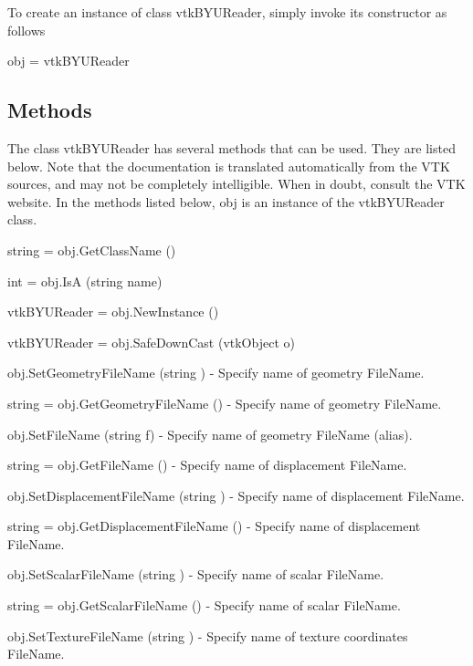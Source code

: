To create an instance of class vtk\-B\-Y\-U\-Reader, simply invoke its constructor as follows \begin{DoxyVerb}  obj = vtkBYUReader
\end{DoxyVerb}
 \hypertarget{vtkwidgets_vtkxyplotwidget_Methods}{}\subsection{Methods}\label{vtkwidgets_vtkxyplotwidget_Methods}
The class vtk\-B\-Y\-U\-Reader has several methods that can be used. They are listed below. Note that the documentation is translated automatically from the V\-T\-K sources, and may not be completely intelligible. When in doubt, consult the V\-T\-K website. In the methods listed below, {\ttfamily obj} is an instance of the vtk\-B\-Y\-U\-Reader class. 
\begin{DoxyItemize}
\item {\ttfamily string = obj.\-Get\-Class\-Name ()}  
\item {\ttfamily int = obj.\-Is\-A (string name)}  
\item {\ttfamily vtk\-B\-Y\-U\-Reader = obj.\-New\-Instance ()}  
\item {\ttfamily vtk\-B\-Y\-U\-Reader = obj.\-Safe\-Down\-Cast (vtk\-Object o)}  
\item {\ttfamily obj.\-Set\-Geometry\-File\-Name (string )} -\/ Specify name of geometry File\-Name.  
\item {\ttfamily string = obj.\-Get\-Geometry\-File\-Name ()} -\/ Specify name of geometry File\-Name.  
\item {\ttfamily obj.\-Set\-File\-Name (string f)} -\/ Specify name of geometry File\-Name (alias).  
\item {\ttfamily string = obj.\-Get\-File\-Name ()} -\/ Specify name of displacement File\-Name.  
\item {\ttfamily obj.\-Set\-Displacement\-File\-Name (string )} -\/ Specify name of displacement File\-Name.  
\item {\ttfamily string = obj.\-Get\-Displacement\-File\-Name ()} -\/ Specify name of displacement File\-Name.  
\item {\ttfamily obj.\-Set\-Scalar\-File\-Name (string )} -\/ Specify name of scalar File\-Name.  
\item {\ttfamily string = obj.\-Get\-Scalar\-File\-Name ()} -\/ Specify name of scalar File\-Name.  
\item {\ttfamily obj.\-Set\-Texture\-File\-Name (string )} -\/ Specify name of texture coordinates File\-Name.  

\end{DoxyItemize}
